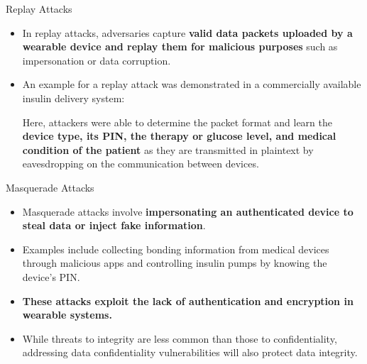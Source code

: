\documentclass[ucs,9pt,usenames,dvipsnames]{beamer}
\begin{document}
\begin{frame}{Replay Attacks}
	\begin{itemize}
		\item In replay attacks, adversaries capture \textbf{valid data packets uploaded by a wearable device and replay them for malicious purposes} such as impersonation or data corruption. 
		\item An example for a replay attack was demonstrated in a commercially available insulin delivery system:
		
		Here, attackers were able to determine the packet format and learn the \textbf{device type, its PIN, the therapy or glucose level, and medical condition of the patient} as they are transmitted in plaintext by eavesdropping on the communication between devices.
	\end{itemize}
\end{frame}

\begin{frame}{Masquerade Attacks}
	\begin{itemize}
		\item Masquerade attacks involve \textbf{impersonating an authenticated device to steal data or inject fake information}. 
		\item Examples include collecting bonding information from medical devices through malicious apps and controlling insulin pumps by knowing the device's PIN.
		\item \textbf{These attacks exploit the lack of authentication and encryption in wearable systems.} 
		\item While threats to integrity are less common than those to confidentiality, addressing data confidentiality vulnerabilities will also protect data integrity.
	\end{itemize}
\end{frame}
\end{document}
